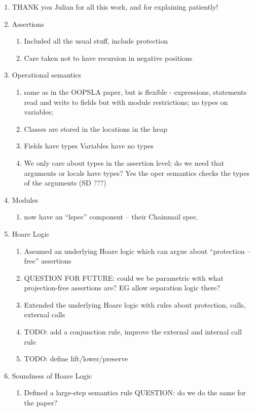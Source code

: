 \documentclass[acmsmall,review,anonymous]{acmart}\settopmatter{printfolios=true}
\begin{document}
\begin{enumerate}
\item
THANK you Julian for all this work, and for explaining patiently!
\item
Assertions
\begin{enumerate}
\item
Included all the usual stuff, include protection
\item
Care taken not to have recursion in negative positions 
\end{enumerate}
\item
Operational semantics
\begin{enumerate}
\item
same as in the OOPSLA paper, but is flexible - expressions, statements read and write to fields but with module restrictions; no types on variables; 
\item
Classes are stored in the locations in the heap
\item
Fields have types
Variables have no types
\item
We only care about types in the assertion level; do we need that arguments or locals have types? Yes the oper semantics checks the types of the arguments (SD ???)
\end{enumerate}
\item
Modules
\begin{enumerate}
\item
now have an “lspec” component – their Chainmail spec.
\end{enumerate}
\item
Hoare Logic
\begin{enumerate}
\item 
Assumed an underlying Hoare logic which can argue about “protection – free” assertions
\item
QUESTION FOR FUTURE: could we be parametric with what projection-free assertions are? EG allow separation logic there?
\item
Extended the underlying Hoare logic with rules about protection, calls, external calls
\item
TODO: add a conjunction rule, improve the external and internal call rule
\item
TODO: define lift/lower/preserve
\end{enumerate}
\item
Soundness of Hoare Logic
\begin{enumerate}
\item 
Defined a large-step semantics rule QUESTION: do we do the same for the paper?
\end{enumerate}
\end{enumerate}
\end{document}
